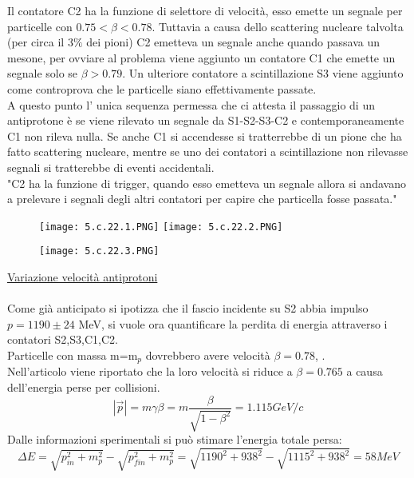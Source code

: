 \documentclass[twoside]{article}
\begin{document}
Il contatore C2 ha la funzione di selettore di velocità, esso emette un segnale per particelle con $0.75<\beta<0.78$. Tuttavia a causa dello scattering nucleare talvolta (per circa il 3$\%$ dei pioni) C2 emetteva un segnale anche quando passava un mesone, per ovviare al problema viene aggiunto un contatore C1 che emette un segnale solo se $\beta>0.79$. Un ulteriore contatore a scintillazione S3 viene aggiunto come controprova che le particelle siano effettivamente passate.\\
A questo punto l' unica sequenza permessa che ci attesta il passaggio di un antiprotone è se viene rilevato un segnale da S1-S2-S3-C2 e contemporaneamente C1 non rileva nulla. Se anche C1 si accendesse si tratterrebbe di un pione che ha fatto scattering nucleare, mentre se uno dei contatori a scintillazione non rilevasse segnali si tratterebbe di eventi accidentali.\\
"C2 ha la funzione di trigger, quando esso emetteva un segnale allora si andavano a prelevare i segnali degli altri contatori per capire che particella fosse passata."
\begin{figure}[H]
    \centering
    \texttt{[image: 5.c.22.1.PNG]}
    \texttt{[image: 5.c.22.2.PNG]}
    \label{fig:5.c.22.1}
\end{figure}
\begin{figure}[H]
    \centering
    \texttt{[image: 5.c.22.3.PNG]}
    \label{fig:5.c.22.3}
\end{figure}

\underline{Variazione velocità antiprotoni}\\
\\
Come già anticipato si ipotizza che il fascio incidente su S2 abbia impulso $p=1190\pm 24$ MeV, si vuole ora quantificare la perdita di energia attraverso i contatori S2,S3,C1,C2.\\
Particelle con massa m=m$_p$ dovrebbero avere velocità $\beta=0.78$, .\\
Nell'articolo viene riportato che la loro velocità si riduce a $\beta=0.765$ a causa dell'energia perse per collisioni. 
\begin{equation}
    |\vec{p}|=m\gamma \beta=m\frac{\beta}{\sqrt{1-\beta^2}}=1.115 GeV/c
\end{equation}
Dalle informazioni sperimentali si può stimare l'energia totale persa:
\begin{equation}
     \Delta E= \sqrt{p_{in}^2+m_p^2}-\sqrt{p_{fin}^2+m_p^2}=\sqrt{1190^2+938^2}-\sqrt{1115^2+938^2}=58 MeV
\end{equation}
\end{document}

